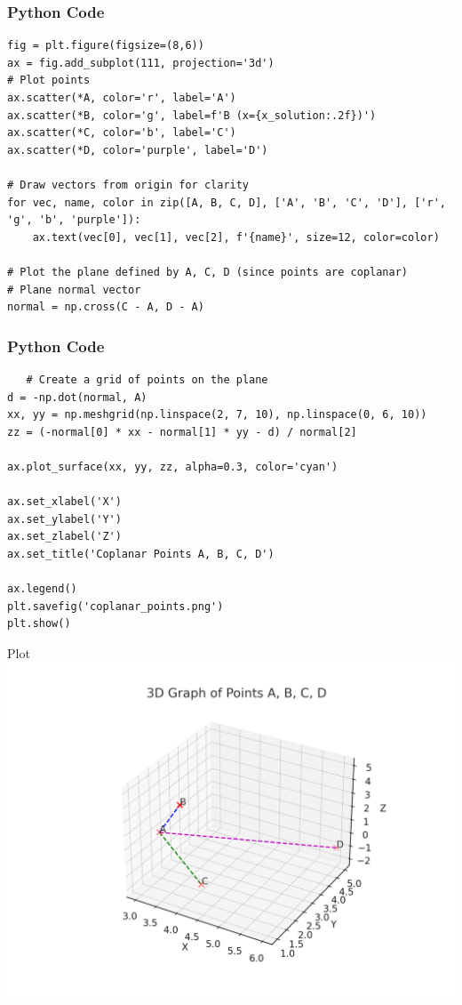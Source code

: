 \documentclass{beamer}
\begin{document}
\begin{frame}[fragile]
    \frametitle{Python Code}
    \begin{lstlisting}
fig = plt.figure(figsize=(8,6))
ax = fig.add_subplot(111, projection='3d')
# Plot points
ax.scatter(*A, color='r', label='A')
ax.scatter(*B, color='g', label=f'B (x={x_solution:.2f})')
ax.scatter(*C, color='b', label='C')
ax.scatter(*D, color='purple', label='D')

# Draw vectors from origin for clarity
for vec, name, color in zip([A, B, C, D], ['A', 'B', 'C', 'D'], ['r', 'g', 'b', 'purple']):
    ax.text(vec[0], vec[1], vec[2], f'{name}', size=12, color=color)

# Plot the plane defined by A, C, D (since points are coplanar)
# Plane normal vector
normal = np.cross(C - A, D - A)
    \end{lstlisting}
\end{frame}
\begin{frame}[fragile]
    \frametitle{Python Code}
    \begin{lstlisting}
   # Create a grid of points on the plane
d = -np.dot(normal, A)
xx, yy = np.meshgrid(np.linspace(2, 7, 10), np.linspace(0, 6, 10))
zz = (-normal[0] * xx - normal[1] * yy - d) / normal[2]

ax.plot_surface(xx, yy, zz, alpha=0.3, color='cyan')

ax.set_xlabel('X')
ax.set_ylabel('Y')
ax.set_zlabel('Z')
ax.set_title('Coplanar Points A, B, C, D')

ax.legend()
plt.savefig('coplanar_points.png')
plt.show()
 \end{lstlisting}
\end{frame}
\begin{frame}{Plot}
    \centering
    \includegraphics[width=\columnwidth, height=0.8\textheight, keepaspectratio]{figs/3D_points_plot.png}     
\end{frame}
\end{document}
